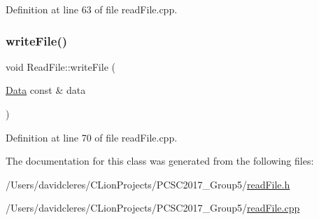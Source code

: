 Definition at line 63 of file read\+File.\+cpp.

\mbox{\label{class_read_file_ac11779a3630a2c1d62ab4566abb4034a}} 
\subsubsection{\texorpdfstring{write\+File()}{writeFile()}}
{\footnotesize\ttfamily void Read\+File\+::write\+File (\begin{DoxyParamCaption}\item[{\mbox{\hyperlink{struct_data}{Data}} const \&}]{data }\end{DoxyParamCaption})}







Definition at line 70 of file read\+File.\+cpp.



The documentation for this class was generated from the following files\+:\begin{DoxyCompactItemize}
\item 
/\+Users/davidcleres/\+C\+Lion\+Projects/\+P\+C\+S\+C2017\+\_\+\+Group5/\mbox{\hyperlink{read_file_8h}{read\+File.\+h}}\item 
/\+Users/davidcleres/\+C\+Lion\+Projects/\+P\+C\+S\+C2017\+\_\+\+Group5/\mbox{\hyperlink{read_file_8cpp}{read\+File.\+cpp}}\end{DoxyCompactItemize}
